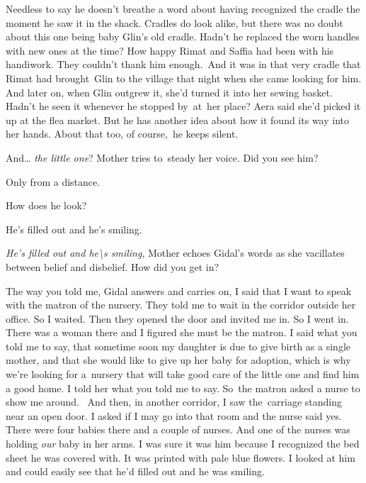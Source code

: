 \documentclass[letterpaper]{article}
\begin{document}
Needless to say he doesn't breathe a word about having recognized the cradle the moment he saw it in the shack. Cradles
do look alike, but there was no doubt about this one being baby Glin's old cradle. Hadn't he replaced the worn handles
with new ones at the time? How happy Rimat and Saffia had been with his handiwork. They couldn't thank him
enough\textcolor[rgb]{0.0,0.4392157,0.7529412}{.\ }And it was in that very cradle that Rimat had
brought\textcolor[rgb]{0.0,0.4392157,0.7529412}{\ }Glin to the village that night when she came looking for him. And
later on, when Glin outgrew it, she'd turned it into her sewing basket. Hadn't he seen it whenever he stopped
by\textcolor{red}{\ }at\textcolor{red}{\ }her place? Aera said she'd picked it up at the flea market. But he has
another idea about how it found its way into her hands. About that too, of course,~he keeps silent.~~

{\textquotedbl}And{\dots} \textit{the little one}?{\textquotedbl} Mother tries to~steady her voice.{\textquotedbl} Did
you see him?{\textquotedbl} 

{\textquotedbl}Only from a distance.{\textquotedbl} 

{\textquotedbl}How does he look?{\textquotedbl} 

{\textquotedbl}He's filled out and he's smiling.{\textquotedbl} 

{\textquotedbl}\textit{He's filled out and he{\textbackslash}s smiling},{\textquotedbl} Mother echoes Gidal's words as
she vacillates between belief and disbelief. {\textquotedbl}How did you get in?{\textquotedbl} 

{\textquotedbl}The way you told me,{\textquotedbl} Gidal answers and carries on, {\textquotedbl}I said that I want to
speak with the matron of the nursery. They told me to wait in the corridor outside her office. So I waited. Then they
opened the door and invited me in. So I went in. There was a woman there and I figured she must be the matron. I said
what you told me to say, that sometime soon my daughter is due to give birth as a single mother, and that she would
like to give up her baby for adoption, which is why we're looking for a~nursery that will take good care of the little
one and find him a good home. I told her what you told me to say. So~the matron asked a nurse to show me around.~ And
then, in another corridor, I saw the~carriage standing near an open door. I asked if I may go into that room and the
nurse said yes. There were four babies there and a couple of nurses. And one of the nurses was holding\textit{ our
}baby in her arms. I was sure it was him because I recognized the bed sheet he was covered with. It was printed with
pale blue flowers. I looked at him and could easily see that he'd filled out and he was smiling. {\textquotedbl} 
\end{document}
